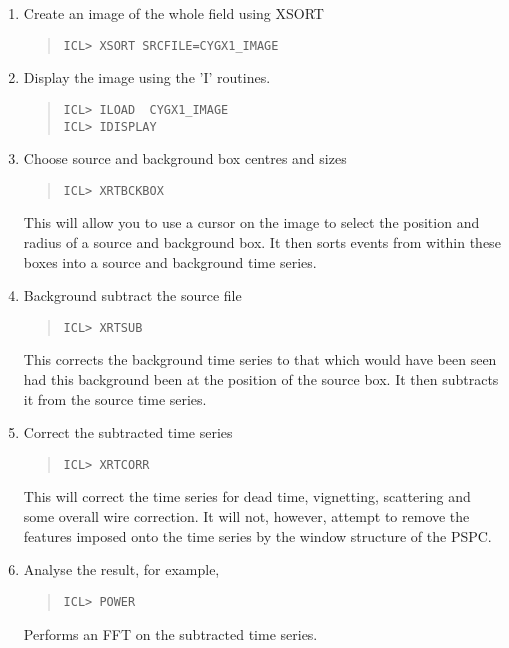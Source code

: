 \documentclass{book}
\renewcommand{\_}{{\tt\char'137}}     %
\begin{document}
\begin{enumerate}
\item Create an image of the whole field using XSORT
\begin{quote}\begin{verbatim}
ICL> XSORT SRCFILE=CYGX1_IMAGE
\end{verbatim}\end{quote}
\item Display the image using the 'I' routines.
\begin{quote}\begin{verbatim}
ICL> ILOAD  CYGX1_IMAGE
ICL> IDISPLAY
\end{verbatim}\end{quote}
\item Choose source and background box centres and sizes
\begin{quote}\begin{verbatim}
ICL> XRTBCKBOX
\end{verbatim}\end{quote}
This will allow you to use a cursor on the image to select
the position and radius of a source and background box.
It then sorts events from within these boxes into a source
and background time series.
\item Background subtract the source file
\begin{quote}\begin{verbatim}
ICL> XRTSUB
\end{verbatim}\end{quote}
This corrects the background time series to that which would have
been seen had this background been at the position of the source
box. It then subtracts it from the source time series.
\item Correct the subtracted time series
\begin{quote}\begin{verbatim}
ICL> XRTCORR
\end{verbatim}\end{quote}
This will correct the time series for dead time, vignetting,
scattering and some overall wire correction. It will not,
however, attempt to remove the features imposed onto the time
series by the window structure of the PSPC.
\item Analyse the result, for example,
\begin{quote}\begin{verbatim}
ICL> POWER
\end{verbatim}\end{quote}
Performs an FFT on the subtracted time series.
\end{enumerate}
\end{document}

